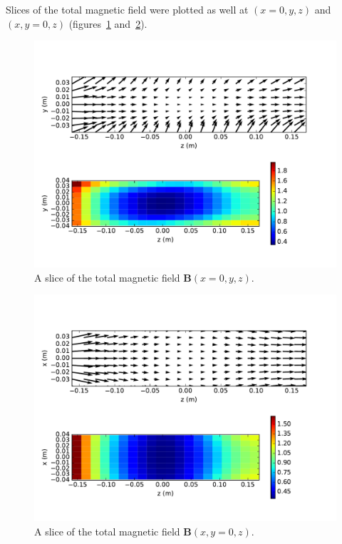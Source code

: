 \documentclass[11pt, a4paper]{article}
\begin{document}
Slices of the total magnetic field were plotted as well at $(x=0, y, z)$ and $(x, y=0, z)$ (figures~\ref{fig:totalb_yz} and~\ref{fig:totalb_xz}).
\begin{figure}
    \centering
    \includegraphics[width=\textwidth]{output/total_B_yz.pdf}
    \caption{A slice of the total magnetic field $\mathbf{B}(x=0, y, z)$. }
    \label{fig:totalb_yz}
\end{figure}
\begin{figure}
    \centering
    \includegraphics[width=\textwidth]{output/total_B_xz.pdf}
    \caption{A slice of the total magnetic field $\mathbf{B}(x, y = 0, z)$. }
    \label{fig:totalb_xz}
\end{figure}
\end{document}
